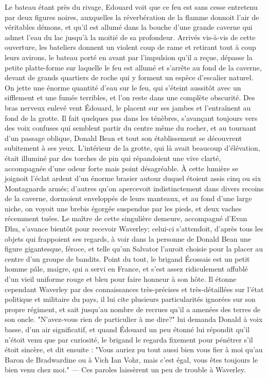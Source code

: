 Le bateau étant près du rivage, Edouard voit que ce feu est sans cesse entretenu par deux figures noires, auxquelles la réverbération de la flamme donnoit l'air de véritables démons, et qu'il est allumé dans la bouche d'une grande caverne qui admet l'eau du lac jusqu'à la moitié de sa profondeur. Arrivés vis-à-vis de cette ouverture, les bateliers donnent un violent coup de rame et retirant tout à coup leurs avirons, le bateau porté en avant par l'impulsion qu'il a reçue, dépasse la petite platte-forme sur laquelle le feu est allumé et s'arrête au fond de la caverne, devant de grands quartiers de roche qui y forment un espèce d'escalier naturel. On jette une énorme quantité d'eau sur le feu, qui s'éteint aussitôt avec un sifflement et une fumée terribles, et l'on reste dans une complète obscurité. Des bras nerveux enlevé\setcounter{page}{107} vent Édouard, le placent sur ses jambes et l'entraînent au fond de la grotte. Il fait quelques pas dans les ténèbres, s'avançant toujours vers des voix confuses qui semblent partir du centre même du rocher, et au tournant d'un passage oblique, Donald Bean et tout son établissement se découvrent subitement à ses yeux.
L'intérieur de la grotte, qui là avait beaucoup d'élévation, était illuminé par des torches de pin qui répandoient une vive clarté, accompagnée d'une odeur forte mais point désagréable. À cette lumière se joignoit l'éclat ardent d'un énorme brasier autour duquel étoient assis cinq ou six Montagnards armés; d'autres qu'on apercevoit indistinctement dans divers recoins de la caverne, dormoient enveloppés de leurs manteaux, et au fond d'une large niche, on voyoit une brebis égorgée suspendue par les pieds, et deux vaches récemment tuées. Le maître de cette singulière demeure, accompagné d'Evan Dhu, s'avance bientôt pour recevoir Waverley; celui-ci s'attendoit, d'après tous les objets qui frappoient ses regards, à voir dans la personne de Donald Bean une figure gigantesque, féroce, et telle qu'un Salvator l'auroit choisie pour la placer au centre d'un\setcounter{page}{108} groupe de bandits. Point du tout, le brigand Écossais est un petit homme pâle, maigre, qui a servi en France, et s'est assez ridiculement affublé d'un vieil uniforme rouge et bleu pour faire honneur à son hôte. Il étonne cependant Waverley par des connaissances très-précises et très-détaillées sur l'état politique et militaire du pays, il lui cite plusieurs particularités ignorées sur son propre régiment, et sait jusqu'au nombre de recrues qu'il a amenées des terres de son oncle.
"N'avez-vous rien de particulier à me dire?" lui demanda Donald à voix basse, d'un air significatif, et quand Édouard un peu étonné lui répondit qu'il n'étoit venu que par curiosité, le brigand le regarda fixement pour pénétrer s'il étoit sincère, et dit ensuite : "Vous auriez pu tout aussi bien vous fier à moi qu'au Baron de Bradwardine ou à Vich Ian Vohr, mais c'est égal, vous êtes toujours le bien venu chez moi." — Ces paroles laissèrent un peu de trouble à Waverley.
